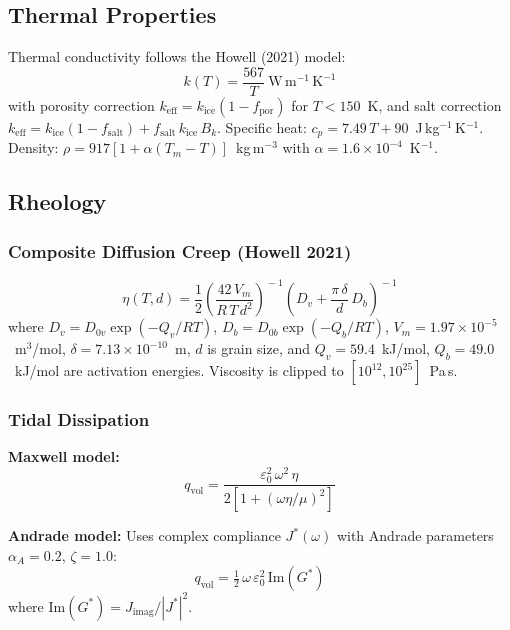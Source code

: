 \documentclass[11pt,letterpaper]{article}
\begin{document}
\subsection{Thermal Properties}

Thermal conductivity follows the Howell (2021) model:
\begin{equation}
  k(T) = \frac{567}{T}~\mathrm{W\,m^{-1}\,K^{-1}}
\end{equation}
with porosity correction $k_\mathrm{eff} = k_\mathrm{ice}(1 - f_\mathrm{por})$ for $T < 150$~K, and salt correction $k_\mathrm{eff} = k_\mathrm{ice}(1 - f_\mathrm{salt}) + f_\mathrm{salt}\,k_\mathrm{ice}\,B_k$. Specific heat: $c_p = 7.49\,T + 90$~J\,kg$^{-1}$\,K$^{-1}$. Density: $\rho = 917[1 + \alpha(T_m - T)]$~kg\,m$^{-3}$ with $\alpha = 1.6 \times 10^{-4}$~K$^{-1}$.

\subsection{Rheology}

\subsubsection{Composite Diffusion Creep (Howell 2021)}

\begin{equation}
  \eta(T, d) = \frac{1}{2}\left(\frac{42\,V_m}{R\,T\,d^2}\right)^{\!-1}
  \!\left(D_v + \frac{\pi\,\delta}{d}\,D_b\right)^{\!-1}
\end{equation}
where $D_v = D_{0v}\exp(-Q_v/RT)$, $D_b = D_{0b}\exp(-Q_b/RT)$, $V_m = 1.97 \times 10^{-5}$~m$^3$/mol, $\delta = 7.13 \times 10^{-10}$~m, $d$ is grain size, and $Q_v = 59.4$~kJ/mol, $Q_b = 49.0$~kJ/mol are activation energies. Viscosity is clipped to $[10^{12}, 10^{25}]$~Pa\,s.

\subsubsection{Tidal Dissipation}

\textbf{Maxwell model:}
\begin{equation}
  q_\mathrm{vol} = \frac{\varepsilon_0^2\,\omega^2\,\eta}{2\left[1 + (\omega\eta/\mu)^2\right]}
\end{equation}

\textbf{Andrade model:} Uses complex compliance $J^*(\omega)$ with Andrade parameters $\alpha_A = 0.2$, $\zeta = 1.0$:
\begin{equation}
  q_\mathrm{vol} = \tfrac{1}{2}\,\omega\,\varepsilon_0^2\,\mathrm{Im}(G^*)
\end{equation}
where $\mathrm{Im}(G^*) = J_\mathrm{imag}/|J^*|^2$.
\end{document}
